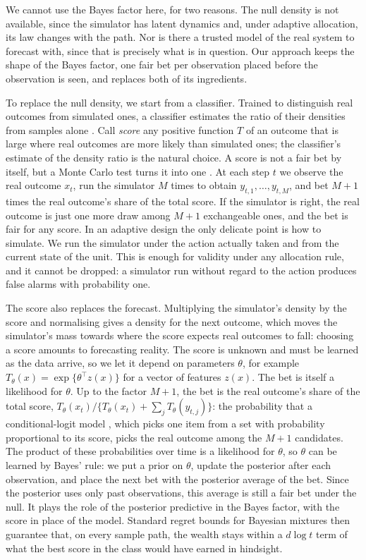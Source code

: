 \documentclass[pdflatex,sn-mathphys-ay]{sn-jnl}
\theoremstyle{thmstyleone}
\theoremstyle{thmstyletwo}
\begin{document}
We cannot use the Bayes factor here, for two reasons. The null density is not
available, since the simulator has latent dynamics and, under adaptive
allocation, its law changes with the path. Nor is there a trusted model of the
real system to forecast with, since that is precisely what is in question.
Our approach keeps the shape of the Bayes factor, one fair bet per
observation placed before the observation is seen, and replaces both of its
ingredients.

To replace the null density, we start from a classifier. Trained to
distinguish real outcomes from simulated ones, a classifier estimates the
ratio of their densities from samples alone \citep{thomas2022lfire}. Call
\emph{score} any positive function $T$ of an outcome that is large where real
outcomes are more likely than simulated ones; the classifier's estimate of the
density ratio is the natural choice. A score is not a fair bet by itself, but
a Monte Carlo test turns it into one \citep{besag1989generalized}. At each
step $t$ we observe the real outcome $x_t$, run the simulator $M$ times to
obtain $y_{t,1},\dots,y_{t,M}$, and bet $M+1$ times the real outcome's share
of the total score. If the simulator is right, the real outcome is just one
more draw among $M+1$ exchangeable ones, and the bet is fair for any score. In
an adaptive design the only delicate point is how to simulate. We run the
simulator under the action actually taken and from the current state of the
unit. This is enough for validity under any allocation rule, and it cannot be
dropped: a simulator run without regard to the action produces false alarms
with probability one.

The score also replaces the forecast. Multiplying the simulator's density by
the score and normalising gives a density for the next outcome, which moves
the simulator's mass towards where the score expects real outcomes to fall:
choosing a score amounts to forecasting reality. The score is unknown and must
be learned as the data arrive, so we let it depend on parameters $\theta$, for
example $T_\theta(x) = \exp\{\theta^\top z(x)\}$ for a vector of features
$z(x)$. The bet is itself a likelihood for $\theta$. Up to the factor $M+1$,
the bet is the real outcome's share of the total score,
$T_\theta(x_t)/\{T_\theta(x_t) + \sum_{j} T_\theta(y_{t,j})\}$: the
probability that a conditional-logit model \citep{mcfadden1974conditional},
which picks one item from a set
with probability proportional to its score, picks the real outcome among the
$M+1$ candidates. The product of these probabilities over time is a likelihood
for $\theta$, so $\theta$ can be learned by Bayes' rule: we put a prior on
$\theta$, update the posterior after each observation, and place the next bet
with the posterior average of the bet. Since the posterior uses only past
observations, this average is still a fair bet under the null. It plays the
role of the posterior predictive in the Bayes factor, with the score in place
of the model. Standard regret bounds for Bayesian mixtures
\citep{kakade2005online} then guarantee that, on every sample path, the wealth
stays within a $d\log t$ term of what the best score in the class would have
earned in hindsight.
\end{document}
